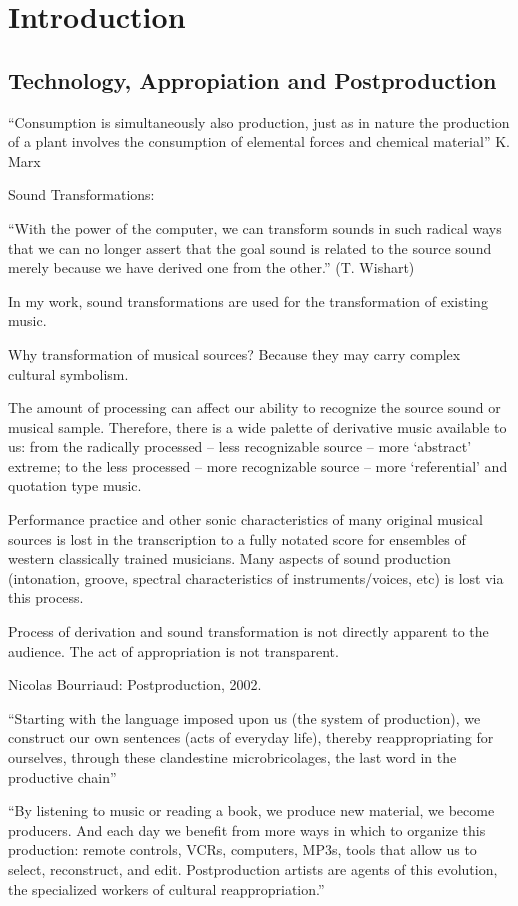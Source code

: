 \chapter{Introduction}


\section{Technology, Appropiation and Postproduction} 

``Consumption is simultaneously also production, just as in nature the production of a plant involves the consumption of elemental forces and chemical material'' K. Marx

Sound Transformations: 					

``With the power of the computer, we can transform sounds in such radical ways that we can no longer assert that the goal sound is related to the source sound merely because we have derived one from the other.'' (T. Wishart)

In my work, sound transformations are used for the transformation of existing music. 

Why transformation of musical sources? Because they may carry complex cultural symbolism. 

The amount of processing can affect our ability to recognize the source sound or musical sample. Therefore, there is a wide palette of derivative music available to us: from the radically processed – less recognizable source – more `abstract' extreme; to the less processed – more recognizable source – more `referential'  and quotation type music.

Performance practice and other sonic characteristics of many original musical sources is lost in the transcription to a fully notated score for ensembles of western classically trained musicians. Many aspects of sound production (intonation, groove, spectral characteristics of instruments/voices, etc) is lost via this process.

Process of derivation and sound transformation is not directly apparent to the audience. The act of appropriation is not transparent.

Nicolas Bourriaud: Postproduction, 2002.

``Starting with the language imposed upon us (the system of production), we construct our own sentences (acts of everyday life), thereby reappropriating for ourselves, through these clandestine microbricolages, the last word in the productive chain''

``By listening to music or reading a book, we produce new material, we become producers. And each day we benefit from more ways in which to organize this production: remote controls, VCRs, computers, MP3s, tools that allow us to select, reconstruct, and edit. Postproduction artists are agents of this evolution, the specialized workers of cultural reappropriation.''

